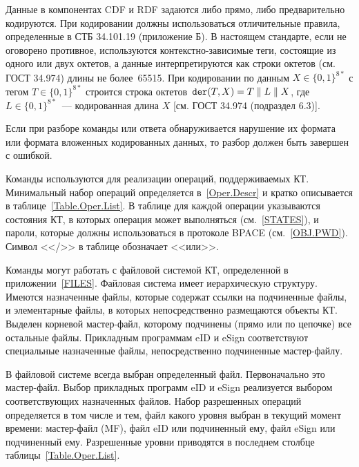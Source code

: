 Данные в компонентах CDF и RDF задаются либо прямо, либо предварительно кодируются. 
При кодировании должны использоваться отличительные правила, определенные в СТБ 34.101.19 
(приложение Б). В настоящем стандарте, если не оговорено противное, используются 
контекстно-зависимые теги, состоящие из одного или двух октетов, а данные 
интерпретируются как строки октетов (см. ГОСТ 34.974) длины не более~65515. 
При кодировании по данным $X\in\{0,1\}^{8*}$ с тегом $T\in\{0,1\}^{8*}$ строится 
строка октетов~$\texttt{der}(T, X) = T \parallel L \parallel X$, 
где $L\in\{0,1\}^{8*}$~--- кодированная длина $X$ [см. ГОСТ 34.974 (подраздел 
6.3)].  

Если при разборе команды или ответа обнаруживается нарушение их 
формата или формата вложенных кодированных данных, то разбор 
должен быть завершен с ошибкой. 

Команды используются для реализации операций, поддерживаемых КТ.
Минимальный набор операций определяется в~\ref{Oper.Descr}
и кратко описывается в таблице~\ref{Table.Oper.List}. 
%
В таблице для каждой операции указываются состояния КТ, 
в которых операция может выполняться (см.~\ref{STATES}),
и пароли, которые должны использоваться в протоколе BPACE (см.~\ref{OBJ.PWD}).  
%
Символ <</>> в таблице обозначает <<или>>.

Команды могут работать с файловой системой КТ, определенной в 
приложении~\ref{FILES}. Файловая система имеет иерархическую структуру.
Имеются назначенные файлы, которые содержат ссылки на подчиненные файлы,
и элементарные файлы, в которых непосредственно размещаются объекты КТ.
Выделен корневой мастер-файл, которому подчинены (прямо или по цепочке)
все остальные файлы. Прикладным программам eID и eSign соответствуют 
специальные назначенные файлы, непосредственно подчиненные мастер-файлу.

В файловой системе всегда выбран определенный файл. Первоначально это 
мастер-файл. Выбор прикладных программ eID и eSign реализуется 
выбором соответствующих назначенных файлов. 
Набор разрешенных операций определяется в том числе и тем, файл какого уровня
выбран в текущий момент времени: мастер-файл (MF), файл eID или подчиненный 
ему, файл eSign или подчиненный ему. Разрешенные уровни приводятся в последнем 
столбце таблицы~\ref{Table.Oper.List}.

